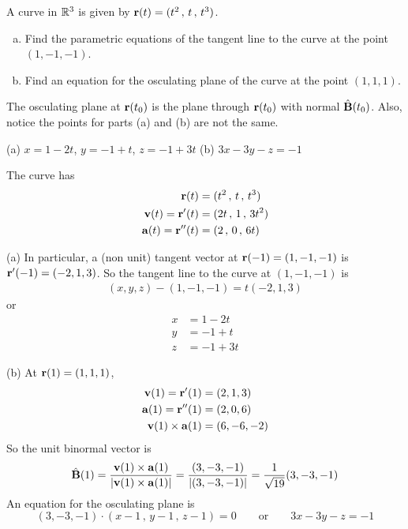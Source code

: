 \begin{question}[M317 2016D] %
A curve in $\mathbb{R}^3$ is given by $\mathbf{r}(t) = (t^2\,,\, t\,,\, t^3)$.
\begin{enumerate}[(a)]
\item
Find the parametric equations of the tangent line to the curve at the point 
$(1, -1, -1)$.
\item
Find an equation for the osculating plane of the curve at the point 
$(1, 1, 1)$.
\end{enumerate}
\end{question}

\begin{hint} 
The osculating plane at $\mathbf{r}(t_0)$ is the plane through
$\mathbf{r}(t_0)$ with normal $\hat{\mathbf{B}}(t_0)$. Also, notice the points for parts (a) and (b) are not the same.
\end{hint}

\begin{answer} 
(a) $x=1-2t$, 
$y=-1+t$,
$z=-1+3t$\qquad
(b) $3x-3y-z = -1$
\end{answer}

\begin{solution} 
The curve has
\begin{align*}
\mathbf{r}(t) &= (t^2\,,\, t\,,\, t^3) \\
\mathbf{v}(t)= \mathbf{r}'(t) &= (2t\,,\, 1\,,\, 3t^2) \\
\mathbf{a}(t)= \mathbf{r}''(t) &= (2\,,\, 0\,,\, 6t) 
\end{align*}

(a) In particular, a (non unit) tangent vector at $\mathbf{r}(-1) = (1, -1, -1)$
is $\mathbf{r}'(-1) = (-2, 1,3)$. So the tangent line to the curve at
$(1, -1, -1)$ is
\begin{align*}
(x,y,z) - (1, -1, -1) = t (-2, 1, 3)
\end{align*}
or
\begin{align*}
x&=1-2t \\
y&=-1+t \\
z&=-1+3t
\end{align*}

(b) At $\mathbf{r}(1)= (1,1,1)$,
\begin{align*}
\mathbf{v}(1)= \mathbf{r}'(1) &= (2, 1, 3) \\
\mathbf{a}(1)= \mathbf{r}''(1) &= (2, 0, 6) \\
\mathbf{v}(1)\times\mathbf{a}(1) &= (6,-6,-2)
\end{align*}
So the unit binormal vector is
\begin{equation*}
\hat{\mathbf{B}}(1) = \frac{\mathbf{v}(1)\times \mathbf{a}(1)}{|\mathbf{v}(1)\times \mathbf{a}(1)|}
           =\frac{(3,-3,-1)}{|(3,-3,-1)|}
           =\frac{1}{\sqrt{19}} (3,-3,-1)
\end{equation*}
An equation for the osculating plane is
\begin{equation*}
(3,-3,-1)\cdot(x-1\,,\,y-1\,,\,z-1) = 0\qquad\text{or}\qquad
3x-3y-z = -1
\end{equation*}
\end{solution}

